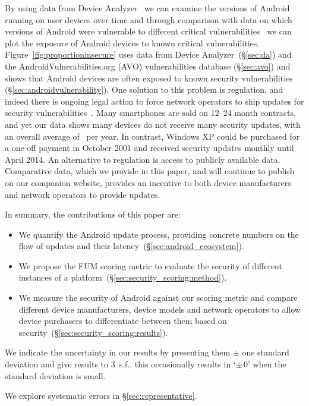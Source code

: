 \documentclass{sig-alternate-2013}
\let\OldTodo\todo
\renewcommand{\todo}{\OldTodo[inline]}
\newcommand{\todolater}[1]{}%
\newcommand{\da}{Device Analyzer}
\newcommand{\avo}{AVO}
\begin{document}
By using data from \da~\cite{Wagner2013} we can examine the versions of Android running on user devices over time and through comparison with data on which versions of Android were vulnerable to different critical vulnerabilities~\cite{androidvulnerabilities.org} we can plot the exposure of Android devices to known critical vulnerabilities.
Figure~\ref{fig:proportioninsecure} uses data from \da\ (\S\ref{sec:da}) and the AndroidVulnerabilities.org (\avo) vulnerabilities database (\S\ref{sec:avo}) and shows that Android devices are often exposed to known security vulnerabilities (\S\ref{sec:androidvulnerability}).
One solution to this problem is regulation, and indeed there is ongoing legal action to force network operators to ship updates for security vulnerabilities~\cite{Soghoian2013}.\todolater{Check on the status of this legal action}
Many smartphones are sold on 12--24 month contracts, and yet our data shows many devices do not receive many security updates, with an overall average of \daUpdatesPerYearNominal\ per year. 
In contrast, Windows XP could be purchased for a one-off payment in October 2001 and received security updates monthly until April 2014.
An alternative to regulation is access to publicly available data.
Comparative data, which we provide in this paper, and will continue to publish on our companion website, provides an incentive to both device manufacturers and network operators to provide updates.

In summary, the contributions of this paper are:
\begin{itemize}
 \item We quantify the Android update process, providing concrete numbers on the flow of updates and their latency~(\S\ref{sec:android_ecosystem}).
 \item We propose the FUM scoring metric to evaluate the security of different instances of a platform~(\S\ref{sec:security_scoring:method}).
 \item We measure the security of Android against our scoring metric and compare different device manufacturers, device models and network operators to allow device purchasers to differentiate between them based on security~(\S\ref{sec:security_scoring:results}).
\end{itemize}

We indicate the uncertainty in our results by presenting them $\pm$ one standard deviation and give results to 3~s.f., this occasionally results in `$\pm\, 0$' when the standard deviation is small.
\todolater{Do we want to use the 95 percentile instead}
We explore systematic errors in \S\ref{sec:representative}.
\end{document}
